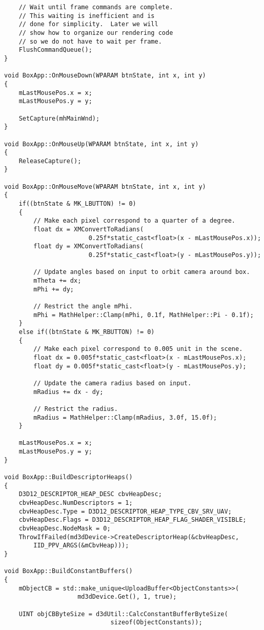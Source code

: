 \begin{lstlisting}
    // Wait until frame commands are complete.  
    // This waiting is inefficient and is
    // done for simplicity.  Later we will 
    // show how to organize our rendering code
    // so we do not have to wait per frame.
    FlushCommandQueue();
}

void BoxApp::OnMouseDown(WPARAM btnState, int x, int y)
{
    mLastMousePos.x = x;
    mLastMousePos.y = y;

    SetCapture(mhMainWnd);
}

void BoxApp::OnMouseUp(WPARAM btnState, int x, int y)
{
    ReleaseCapture();
}

void BoxApp::OnMouseMove(WPARAM btnState, int x, int y)
{
    if((btnState & MK_LBUTTON) != 0)
    {
        // Make each pixel correspond to a quarter of a degree.
        float dx = XMConvertToRadians(
                       0.25f*static_cast<float>(x - mLastMousePos.x));
        float dy = XMConvertToRadians(
                       0.25f*static_cast<float>(y - mLastMousePos.y));

        // Update angles based on input to orbit camera around box.
        mTheta += dx;
        mPhi += dy;

        // Restrict the angle mPhi.
        mPhi = MathHelper::Clamp(mPhi, 0.1f, MathHelper::Pi - 0.1f);
    }
    else if((btnState & MK_RBUTTON) != 0)
    {
        // Make each pixel correspond to 0.005 unit in the scene.
        float dx = 0.005f*static_cast<float>(x - mLastMousePos.x);
        float dy = 0.005f*static_cast<float>(y - mLastMousePos.y);

        // Update the camera radius based on input.
        mRadius += dx - dy;

        // Restrict the radius.
        mRadius = MathHelper::Clamp(mRadius, 3.0f, 15.0f);
    }

    mLastMousePos.x = x;
    mLastMousePos.y = y;
}

void BoxApp::BuildDescriptorHeaps()
{
    D3D12_DESCRIPTOR_HEAP_DESC cbvHeapDesc;
    cbvHeapDesc.NumDescriptors = 1;
    cbvHeapDesc.Type = D3D12_DESCRIPTOR_HEAP_TYPE_CBV_SRV_UAV;
    cbvHeapDesc.Flags = D3D12_DESCRIPTOR_HEAP_FLAG_SHADER_VISIBLE;
    cbvHeapDesc.NodeMask = 0;
    ThrowIfFailed(md3dDevice->CreateDescriptorHeap(&cbvHeapDesc,
        IID_PPV_ARGS(&mCbvHeap)));
}

void BoxApp::BuildConstantBuffers()
{
    mObjectCB = std::make_unique<UploadBuffer<ObjectConstants>>(
                    md3dDevice.Get(), 1, true);

    UINT objCBByteSize = d3dUtil::CalcConstantBufferByteSize(
                             sizeof(ObjectConstants));


\end{lstlisting}
